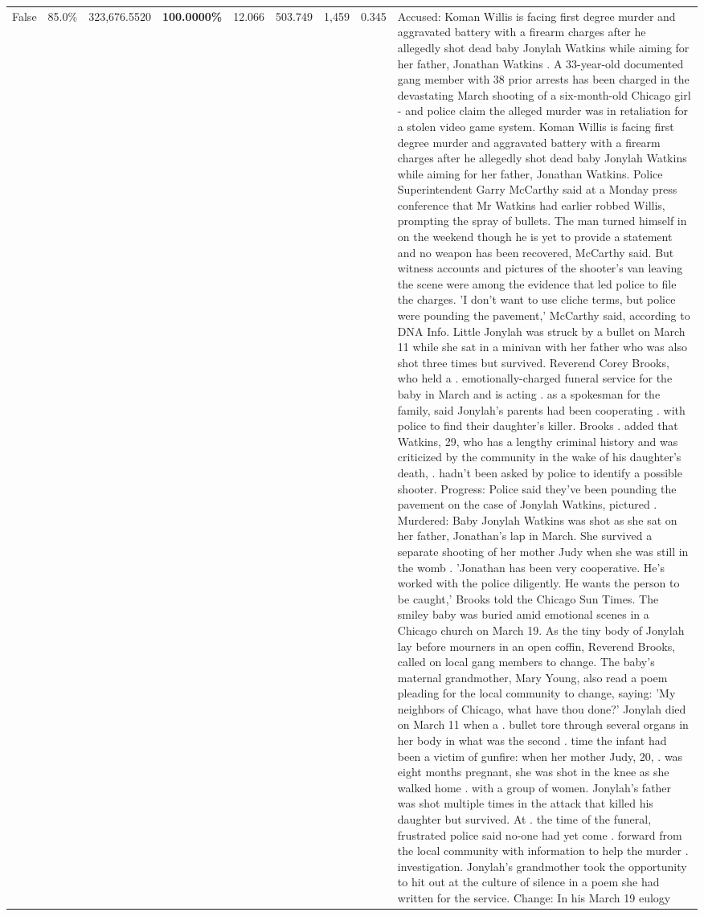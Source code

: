 \begin{table}[H]
\begin{tabular}{lllrlllll}
False & 85.0\% & 323,676.5520 & \bfseries \color{red} 100.0000\% & 12.066 & 503.749 & 1,459 & 0.345 & Accused: Koman Willis is facing first degree murder and aggravated battery with a firearm charges after he allegedly shot dead baby Jonylah Watkins while aiming for her father, Jonathan Watkins . A 33-year-old documented gang member with 38 prior arrests has been charged in the devastating March shooting of a six-month-old Chicago girl - and police claim the alleged murder was in retaliation for a stolen video game system. Koman Willis is facing first degree murder and aggravated battery with a firearm charges after he allegedly shot dead baby Jonylah Watkins while aiming for her father, Jonathan Watkins. Police Superintendent Garry McCarthy said at a Monday press conference that Mr Watkins had earlier robbed Willis, prompting the spray of bullets. The man turned himself in on the weekend though he is yet to provide a statement and no weapon has been recovered, McCarthy said. But witness accounts and pictures of the shooter's van leaving the scene were among the evidence that led police to file the charges. 'I don't want to use cliche terms, but police were pounding the pavement,' McCarthy said, according to DNA Info. Little Jonylah was struck by a bullet on March 11 while she sat in a minivan with her father who was also shot three times but survived. Reverend Corey Brooks, who held a . emotionally-charged funeral service for the baby in March and is acting . as a spokesman for the family, said Jonylah's parents had been cooperating . with police to find their daughter's killer. Brooks . added that Watkins, 29, who has a lengthy criminal history and was criticized by the community in the wake of his daughter's death, . hadn't been asked by police to identify a possible shooter. Progress: Police said they've been pounding the pavement on the case of Jonylah Watkins, pictured . Murdered: Baby Jonylah Watkins was shot as she sat on her father, Jonathan's lap in March. She survived a separate shooting of her mother Judy when she was still in the womb . 'Jonathan has been very cooperative. He's worked with the police diligently. He wants the person to be caught,' Brooks told the Chicago Sun Times. The smiley baby was buried amid emotional scenes in a Chicago church on March 19. As the tiny body of Jonylah lay before mourners in an open coffin, Reverend Brooks, called on local gang members to change. The baby's maternal grandmother, Mary Young, also read a poem pleading for the local community to change, saying: 'My neighbors of Chicago, what have thou done?' Jonylah died on March 11 when a . bullet tore through several organs in her body in what was the second . time the infant had been a victim of gunfire: when her mother Judy, 20, . was eight months pregnant, she was shot in the knee as she walked home . with a group of women. Jonylah's father was shot multiple times in the attack that killed his daughter but survived. At . the time of the funeral, frustrated police said no-one had yet come . forward from the local community with information to help the murder . investigation. Jonylah's grandmother took the opportunity to hit out at the culture of silence in a poem she had written for the service. Change: In his March 19 eulogy 
\end{tabular}
\end{table}
